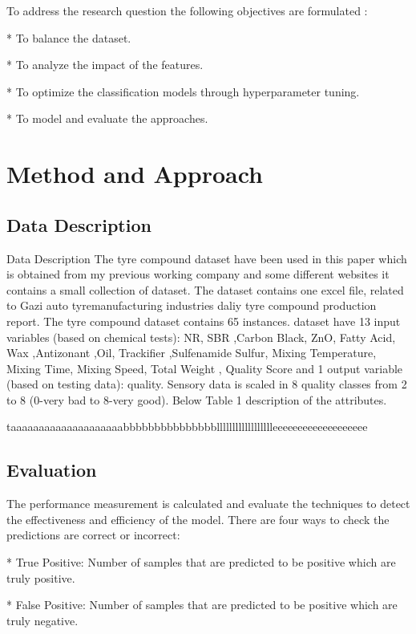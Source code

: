 \documentclass{article}
\begin{document}
To address the research question the following objectives are
formulated :


* To balance the dataset.

* To analyze the impact of the features.


* To optimize the classification models through hyperparameter
tuning.


* To model and evaluate the approaches.

\section{Method and Approach
}

\subsection{Data Description}

Data Description
The tyre compound dataset have been used in this paper
which is obtained from my previous working company and some different websites it
contains a small collection of dataset. The dataset contains one excel file,
related to Gazi auto tyremanufacturing industries daliy tyre compound production report. The tyre compound dataset contains 65
instances. dataset have 13 input variables (based on chemical tests):
NR,	SBR	,Carbon Black,	ZnO,	Fatty Acid,	Wax	,Antizonant	,Oil,	Trackifier	,Sulfenamide	Sulfur,	Mixing Temperature,	Mixing Time,	Mixing Speed,	Total Weight , Quality Score and 1 output variable (based on testing data): quality. Sensory data is
scaled in 8 quality classes from 2 to 8 (0-very bad to 8-very good).
Below Table 1 description of the attributes.

taaaaaaaaaaaaaaaaaaaabbbbbbbbbbbbbbblllllllllllllllllleeeeeeeeeeeeeeeeeee


\subsection{Evaluation}


The performance measurement is calculated and evaluate the
techniques to detect the effectiveness and efficiency of the model.
There are four ways to check the predictions are correct or incorrect:


* True Positive: Number of samples that are predicted to be
positive which are truly positive.


* False Positive: Number of samples that are predicted to be
positive which are truly negative.
\end{document}
